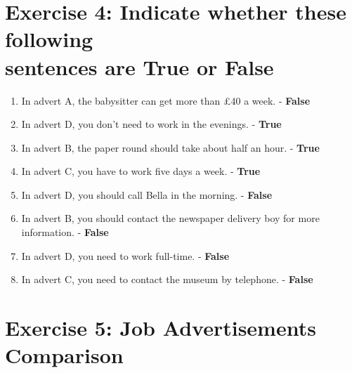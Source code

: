 \documentclass[12pt,titlepage]{article}
\begin{document}
\section{Exercise 4: Indicate whether these following \\ sentences are True or False}

\begin{enumerate}
    \item In advert A, the babysitter can get more than £40 a week. - \textbf{False}
    \item In advert D, you don't need to work in the evenings. - \textbf{True}
    \item In advert B, the paper round should take about half an hour. - \textbf{True}
    \item In advert C, you have to work five days a week. - \textbf{True}
    \item In advert D, you should call Bella in the morning. - \textbf{False}
    \item In advert B, you should contact the newspaper delivery boy for more information. - \textbf{False}
    \item In advert D, you need to work full-time. - \textbf{False}
    \item In advert C, you need to contact the museum by telephone. - \textbf{False}
\end{enumerate}

\pagebreak

\section{Exercise 5: Job Advertisements Comparison}
\end{document}
